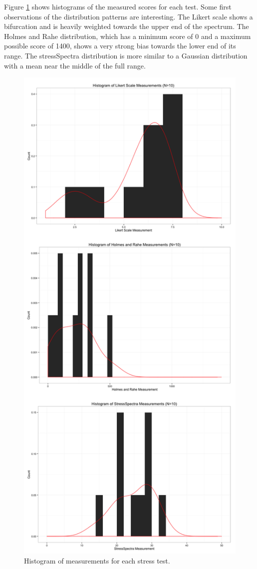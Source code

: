 \documentclass{sigchi}
\begin{document}
Figure \ref{fig:rangeuse} shows histograms of the measured scores for each test. Some first observations of the distribution patterns are interesting. The Likert scale shows a bifurcation and is heavily weighted towards the upper end of the spectrum. The Holmes and Rahe distribution, which has a minimum score of 0 and a maximum possible score of 1400, shows a very strong bias towards the lower end of its range. The stressSpectra distribution is more similar to a Gaussian distribution with a mean near the middle of the full range. 
\begin{figure}[htb]
\centering
\includegraphics[width=0.9\columnwidth]{rangeUse}
\caption{Histogram of measurements for each stress test.}
\label{fig:rangeuse}
\end{figure}
\end{document}
